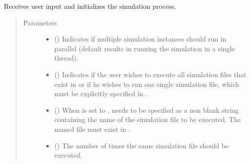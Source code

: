 \documentclass[letterpaper,10pt,english]{sphinxmanual}
\begin{document}

\begin{fulllineitems}
\label{\detokenize{app:app.hive_simulation.main}}
Receives user input and initializes the simulation process.
\begin{quote}\begin{description}
\item[{Parameters}] \leavevmode\begin{itemize}
\item {} 
 () \textendash{} Indicates if multiple simulation instances should run in parallel
(default results in running the simulation in a
single thread).

\item {} 
 () \textendash{} Indicates if the user wishes to execute all simulation files
that exist in
{\hyperref[\detokenize{app:app.environment_settings.SIMULATION_ROOT}]{}} or
if he wishes to run one single simulation file, which must be
explicitly specified in .

\item {} 
 (\sphinxstyleliteralemphasis{\sphinxupquote{{[}}}\sphinxstyleliteralemphasis{\sphinxupquote{{]}}}) \textendash{} When  is set to ,  needs to be specified as a
non blank string containing the name of the simulation file to
be executed. The named file must exist in
{\hyperref[\detokenize{app:app.environment_settings.SIMULATION_ROOT}]{}}.

\item {} 
 () \textendash{} The number of times the same simulation file should be executed.


\end{itemize}
\end{description}
\end{quote}
\end{fulllineitems}
\end{document}
